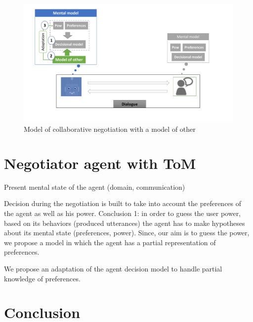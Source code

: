 \documentclass[sigconf]{aamas}  %
\begin{document}
	\begin{figure}
		\includegraphics[width=0.65\linewidth, height= 0.25\textheight]{figs/model_tom.pdf}
		\caption{Model of collaborative negotiation with a model of other} 
		\label{fig:schema-general}
	\end{figure} 


	\section{Negotiator agent with ToM}
		Present mental state of the agent (domain, communication) 
		
		Decision during the negotiation is built to take into account the preferences of the agent as well as his power. 
		Conclusion 1: in order to guess the user power, based on its behaviors (produced utterances) the agent has to make hypotheses about its mental state (preferences, power). Since, our aim is to guess the power, we propose a model in which the agent has a partial representation of preferences. 
		
		We propose an adaptation of the agent decision model to handle partial knowledge of preferences. 
		
	\section{Conclusion}

	
	
	
\end{document}
